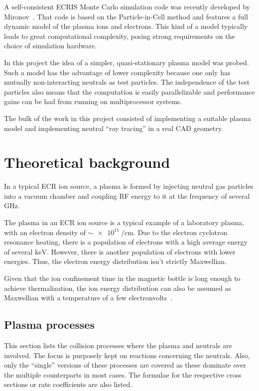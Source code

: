 \documentclass[a4paper,twoside,12pt]{article}
\begin{document}
A self-consistent ECRIS Monte Carlo simulation code was recently developed by
Mi\-ro\-nov~\cite{mironov:ecr}. That code is based on the Particle-in-Cell method
and features a full dynamic model of the plasma ions and electrons. This kind
of a model typically leads
to great computational complexity, posing strong requirements on the choice of
simulation hardware.

In this project the idea of a simpler, quasi-stationary plasma model was probed. Such a model has the advantage of lower complexity because one only has mutually non-interacting neutrals as test particles. The independence of the test particles also means that the computation is easily parallelizable and performance gains can be had from running on multiprocessor systems.

The bulk of the work in this project consisted of implementing a suitable plasma model and implementing neutral ``ray tracing'' in a real CAD geometry.

\section{Theoretical background}
In a typical ECR ion source, a plasma is formed by injecting neutral gas particles into a vacuum chamber and coupling RF energy to it at the frequency of several $\si{\giga\hertz}$.

The plasma in an ECR ion source is a typical example of a laboratory plasma,
with an electron density of $\sim\SI{e11}{\per\centi\metre}$. Due to the
electron cyclotron resonance heating, there is a population of electrons with a
high average energy of several $\si{\kilo\electronvolt}$. However, there is
another population of electrons with lower energies. Thus, the electron energy
distribution isn't strictly Maxwellian.~\cite{geller:ecr}

Given that the ion confinement time in the magnetic bottle is long enough to achieve thermalization, the ion energy distribution can also be assumed as Maxwellian with a temperature of a few electronvolts~\cite{geller:ecr}.

\subsection{Plasma processes}
This section lists the collision processes where the plasma and neutrals are
involved. The focus is purposely kept on reactions concerning the neutrals. Also, only the ``single'' versions of these processes are covered as these dominate over the multiple counterparts in most cases. The formulae for the respective cross sections or rate coefficients are also listed.
\end{document}
